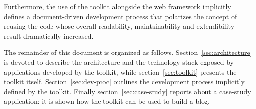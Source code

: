 Furthermore, the use of the toolkit alongside the web framework implicitly defines a document-driven development process that polarizes the concept of reusing the code whose overall readability, maintainability and extendibility result dramatically increased.

The remainder of this document is organized as follows. Section~\ref{sec:architecture} is devoted to describe the architecture and the technology stack exposed by applications developed by the toolkit, while section~\ref{sec:toolkit} presents the toolkit itself. Section~\ref{sec:dev-proc} outlines the development process implicitly defined by the  toolkit. Finally section~\ref{sec:case-study} reports about a case-study application: it is shown how the toolkit can be used to build a blog.

